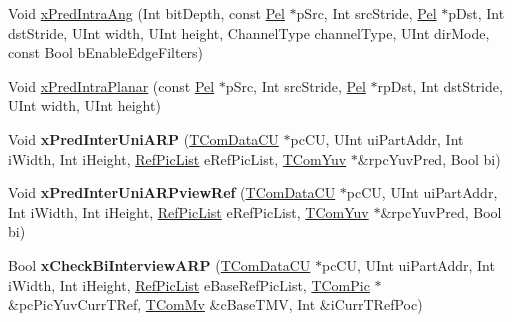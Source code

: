 \begin{DoxyCompactItemize}
\item 
Void \hyperlink{class_t_com_prediction_a726160946b2c5cb38e26afb9fc73833f}{x\+Pred\+Intra\+Ang} (Int bit\+Depth, const \hyperlink{_type_def_8h_af92141699657699b4b547be0c8517541}{Pel} $\ast$p\+Src, Int src\+Stride, \hyperlink{_type_def_8h_af92141699657699b4b547be0c8517541}{Pel} $\ast$p\+Dst, Int dst\+Stride, U\+Int width, U\+Int height, Channel\+Type channel\+Type, U\+Int dir\+Mode, const Bool b\+Enable\+Edge\+Filters)
\item 
Void \hyperlink{class_t_com_prediction_a4eee3804ca1fc40cbcfb43b395601bc5}{x\+Pred\+Intra\+Planar} (const \hyperlink{_type_def_8h_af92141699657699b4b547be0c8517541}{Pel} $\ast$p\+Src, Int src\+Stride, \hyperlink{_type_def_8h_af92141699657699b4b547be0c8517541}{Pel} $\ast$rp\+Dst, Int dst\+Stride, U\+Int width, U\+Int height)
\item 
\mbox{\label{class_t_com_prediction_ad820111ee91c8e8eba0631ec99fb9683}} 
Void {\bfseries x\+Pred\+Inter\+Uni\+A\+RP} (\hyperlink{class_t_com_data_c_u}{T\+Com\+Data\+CU} $\ast$pc\+CU, U\+Int ui\+Part\+Addr, Int i\+Width, Int i\+Height, \hyperlink{_type_def_8h_a93cea48eb9dcfd661168dee82e41b384}{Ref\+Pic\+List} e\+Ref\+Pic\+List, \hyperlink{class_t_com_yuv}{T\+Com\+Yuv} $\ast$\&rpc\+Yuv\+Pred, Bool bi)
\item 
\mbox{\label{class_t_com_prediction_a595fd5a729f94df85f03d23a4d93e3e9}} 
Void {\bfseries x\+Pred\+Inter\+Uni\+A\+R\+Pview\+Ref} (\hyperlink{class_t_com_data_c_u}{T\+Com\+Data\+CU} $\ast$pc\+CU, U\+Int ui\+Part\+Addr, Int i\+Width, Int i\+Height, \hyperlink{_type_def_8h_a93cea48eb9dcfd661168dee82e41b384}{Ref\+Pic\+List} e\+Ref\+Pic\+List, \hyperlink{class_t_com_yuv}{T\+Com\+Yuv} $\ast$\&rpc\+Yuv\+Pred, Bool bi)
\item 
\mbox{\label{class_t_com_prediction_aa14c079ec7e6d334eb69455ff827c7c8}} 
Bool {\bfseries x\+Check\+Bi\+Interview\+A\+RP} (\hyperlink{class_t_com_data_c_u}{T\+Com\+Data\+CU} $\ast$pc\+CU, U\+Int ui\+Part\+Addr, Int i\+Width, Int i\+Height, \hyperlink{_type_def_8h_a93cea48eb9dcfd661168dee82e41b384}{Ref\+Pic\+List} e\+Base\+Ref\+Pic\+List, \hyperlink{class_t_com_pic}{T\+Com\+Pic} $\ast$\&pc\+Pic\+Yuv\+Curr\+T\+Ref, \hyperlink{class_t_com_mv}{T\+Com\+Mv} \&c\+Base\+T\+MV, Int \&i\+Curr\+T\+Ref\+Poc)
\item 

\end{DoxyCompactItemize}
